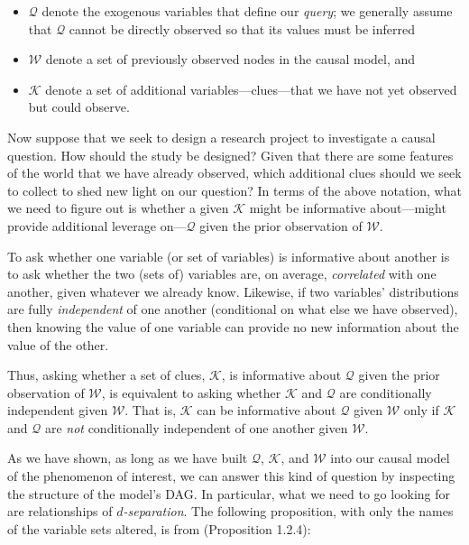 \documentclass[12pt,]{book}
\providecommand{\tightlist}{%
  \setlength{\itemsep}{0pt}\setlength{\parskip}{0pt}}
\begin{document}
\begin{itemize}
\tightlist
\item
  \(\mathcal Q\) denote the exogenous variables that define our \emph{query}; we generally assume that \(\mathcal Q\) cannot be directly observed so that its values must be inferred
\item
  \(\mathcal W\) denote a set of previously observed nodes in the causal model, and
\item
  \(\mathcal K\) denote a set of additional variables---clues---that we have not yet observed but could observe.
\end{itemize}

Now suppose that we seek to design a research project to investigate a causal question. How should the study be designed? Given that there are some features of the world that we have already observed, which additional clues should we seek to collect to shed new light on our question? In terms of the above notation, what we need to figure out is whether a given \(\mathcal K\) might be informative about---might provide additional leverage on---\(\mathcal Q\) given the prior observation of \(\mathcal W\).

To ask whether one variable (or set of variables) is informative about another is to ask whether the two (sets of) variables are, on average, \emph{correlated} with one another, given whatever we already know. Likewise, if two variables' distributions are fully \emph{independent} of one another (conditional on what else we have observed), then knowing the value of one variable can provide no new information about the value of the other.

Thus, asking whether a set of clues, \(\mathcal K\), is informative about \(\mathcal Q\) given the prior observation of \(\mathcal W\), is equivalent to asking whether \(\mathcal K\) and \(\mathcal Q\) are conditionally independent given \(\mathcal W\). That is, \(\mathcal K\) can be informative about \(\mathcal Q\) given \(\mathcal W\) only if \(\mathcal K\) and \(\mathcal Q\) are \emph{not} conditionally independent of one another given \(\mathcal W\).

As we have shown, as long as we have built \(\mathcal Q\), \(\mathcal K\), and \(\mathcal W\) into our causal model of the phenomenon of interest, we can answer this kind of question by inspecting the structure of the model's DAG. In particular, what we need to go looking for are relationships of \emph{\(d\)-separation}. The following proposition, with only the names of the variable sets altered, is from \citet{pearl2009causality} (Proposition 1.2.4):
\end{document}
